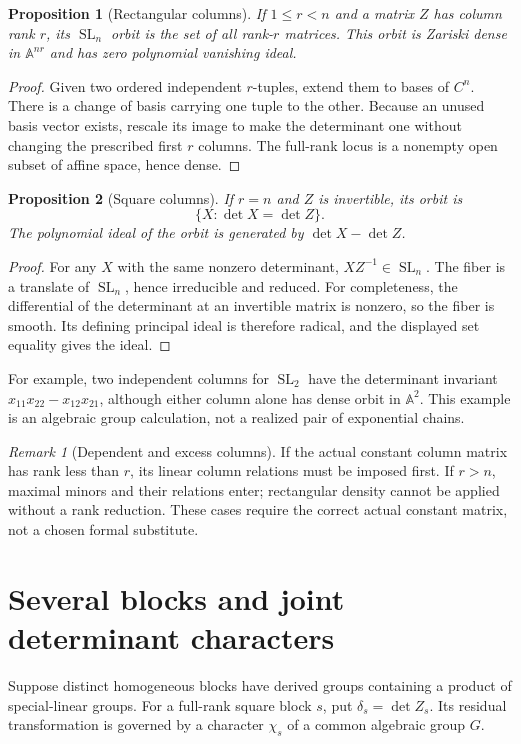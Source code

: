 \documentclass[11pt]{article}
\numberwithin{equation}{section}
\newtheorem{proposition}[proposition]{Proposition}
\theoremstyle{definition}
\theoremstyle{remark}
\newtheorem{remark}[remark]{Remark}
\newcommand{\SL}{\operatorname{SL}}
\newcommand{\A}{\mathbb A}
\begin{document}
\begin{proposition}[Rectangular columns]\label{prop:rectangular}
If $1\le r<n$ and a matrix $Z$ has column rank $r$, its $\SL_n$ orbit
is the set of all rank-$r$ matrices. This orbit is Zariski dense in
$\A^{nr}$ and has zero polynomial vanishing ideal.
\end{proposition}
\begin{proof}
Given two ordered independent $r$-tuples, extend them to bases of $C^n$.
There is a change of basis carrying one tuple to the other. Because an
unused basis vector exists, rescale its image to make the determinant
one without changing the prescribed first $r$ columns. The full-rank
locus is a nonempty open subset of affine space, hence dense.
\end{proof}

\begin{proposition}[Square columns]\label{prop:square}
If $r=n$ and $Z$ is invertible, its orbit is
\[
 \{X:\det X=\det Z\}.
\]
The polynomial ideal of the orbit is generated by
$\det X-\det Z$.
\end{proposition}
\begin{proof}
For any $X$ with the same nonzero determinant, $XZ^{-1}\in\SL_n$.
The fiber is a translate of $\SL_n$, hence irreducible and reduced.
For completeness, the differential of the determinant at an invertible
matrix is nonzero, so the fiber is smooth. Its defining principal ideal
is therefore radical, and the displayed set equality gives the ideal.
\end{proof}
For example, two independent columns for $\SL_2$ have the determinant
invariant $x_{11}x_{22}-x_{12}x_{21}$, although either column alone has
dense orbit in $\A^2$. This example is an algebraic group calculation,
not a realized pair of exponential chains.

\begin{remark}[Dependent and excess columns]
If the actual constant column matrix has rank less than $r$, its linear
column relations must be imposed first. If $r>n$, maximal minors and their
relations enter; rectangular density cannot be applied without a rank
reduction. These cases require the correct actual constant matrix, not a
chosen formal substitute.
\end{remark}

\section{Several blocks and joint determinant characters}
Suppose distinct homogeneous blocks have derived groups containing a
product of special-linear groups. For a full-rank square block $s$, put
$\delta_s=\det Z_s$. Its residual transformation is governed by a
character $\chi_s$ of a common algebraic group $G$.
\end{document}

